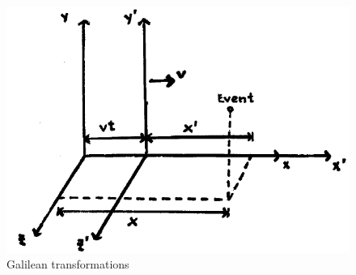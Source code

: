\begin{figure}[ht]
\begin{center}
\includegraphics[scale=0.5]{Draw/lec2_4.png}
\end{center}
\caption{Galilean transformations}
\label{fig:lec2_4}
\end{figure}

